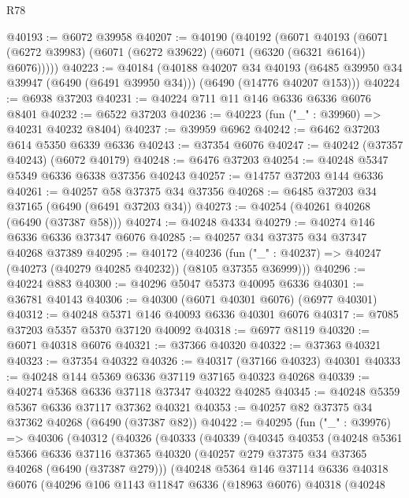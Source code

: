 \begin{lexlean}{R78}
\begin{coremodule}
@40193 := @6072 @39958
@40207 := @40190
    (@40192
      (@6071
        @40193
        (@6071 (@6272 @39983) (@6071 (@6272 @39622) (@6071 (@6320 (@6321 @6164)) @6076)))))
@40223 := @40184
    (@40188
      @40207
      @34
      @40193
      (@6485 @39950 @34 @39947 (@6490 (@6491 @39950 @34)))
      (@6490 (@14776 @40207 @153)))
@40224 := @6938 @37203
@40231 := @40224 @711 @11 @146 @6336 @6336 @6076 @8401
@40232 := @6522 @37203
@40236 := @40223 (fun ("_" : @39960) => @40231 @40232 @8404)
@40237 := @39959 @6962
@40242 := @6462 @37203 @614 @5350 @6339 @6336
@40243 := @37354 @6076
@40247 := @40242 (@37357 @40243) (@6072 @40179)
@40248 := @6476 @37203
@40254 := @40248 @5347 @5349 @6336 @6338 @37356 @40243
@40257 := @14757 @37203 @144 @6336
@40261 := @40257 @58 @37375 @34 @37356
@40268 := @6485 @37203 @34 @37165 (@6490 (@6491 @37203 @34))
@40273 := @40254 (@40261 @40268 (@6490 (@37387 @58)))
@40274 := @40248 @4334
@40279 := @40274 @146 @6336 @6336 @37347 @6076
@40285 := @40257 @34 @37375 @34 @37347 @40268 @37389
@40295 := @40172
    (@40236 (fun ("_" : @40237) => @40247 (@40273 (@40279 @40285 @40232)) (@8105 @37355 @36999)))
@40296 := @40224 @883
@40300 := @40296 @5047 @5373 @40095 @6336
@40301 := @36781 @40143
@40306 := @40300 (@6071 @40301 @6076) (@6977 @40301)
@40312 := @40248 @5371 @146 @40093 @6336 @40301 @6076
@40317 := @7085 @37203 @5357 @5370 @37120 @40092
@40318 := @6977 @8119
@40320 := @6071 @40318 @6076
@40321 := @37366 @40320
@40322 := @37363 @40321
@40323 := @37354 @40322
@40326 := @40317 (@37166 @40323) @40301
@40333 := @40248 @144 @5369 @6336 @37119 @37165 @40323 @40268
@40339 := @40274 @5368 @6336 @37118 @37347 @40322 @40285
@40345 := @40248 @5359 @5367 @6336 @37117 @37362 @40321
@40353 := @40257 @82 @37375 @34 @37362 @40268 (@6490 (@37387 @82))
@40422 := @40295
    (fun ("_" : @39976) =>
    @40306
      (@40312
        (@40326
          (@40333
            (@40339
              (@40345
                @40353
                (@40248
                  @5361
                  @5366
                  @6336
                  @37116
                  @37365
                  @40320
                  (@40257 @279 @37375 @34 @37365 @40268 (@6490 (@37387 @279)))
                  (@40248
                    @5364
                    @146
                    @37114
                    @6336
                    @40318
                    @6076
                    (@40296
                      @106
                      @1143
                      @11847
                      @6336
                      (@18963 @6076)
                      @40318
                      (@40248

\end{coremodule}
\end{lexlean}
